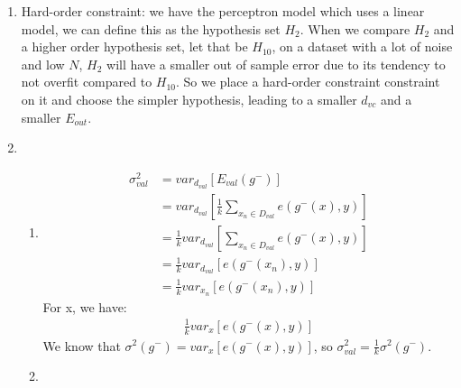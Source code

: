 \documentclass{article}
\begin{document}
\begin{enumerate}
        \item Hard-order constraint: we have the perceptron model which uses a linear model, we can define this as the hypothesis set $H_2$. When we compare $H_2$ and a higher order hypothesis set, let that be $H_{10}$, on a dataset with a lot of noise and low $N$, $H_2$ will have a smaller out of sample error due to its tendency to not overfit compared to $H_{10}$. So we place a hard-order constraint constraint on it and choose the simpler hypothesis, leading to a smaller $d_{vc}$ and a smaller $E_{out}$.
        \item \begin{enumerate}[label=(\alph*)]
            \item \begin{align*}
                \sigma^2_{val} &= var_{d_{val}}[E_{val}(g^-)]\\
                &= var_{d_{val}}[\frac{1}{k}\sum_{x_n \in D_{val}}^{} e(g^-(x), y)]\\
                &= \frac{1}{k}var_{d_{val}}[\sum_{x_n \in D_{val}}^{} e(g^-(x), y)]\\
                &= \frac{1}{k}var_{d_{val}}[e(g^-(x_n), y)]\\
                &= \frac{1}{k}var_{x_n}[e(g^-(x_n), y)]
            \end{align*}
            For x, we have:
            \begin{align*}
                \frac{1}{k}var_x[e(g^-(x), y)]
            \end{align*}
            We know that $\sigma^2(g^-) = var_x[e(g^-(x), y)]$, so $\sigma^2_{val} = \frac{1}{k}\sigma^2(g^-)$.
            \item 
        \end{enumerate}
    \end{enumerate}
\end{document}
